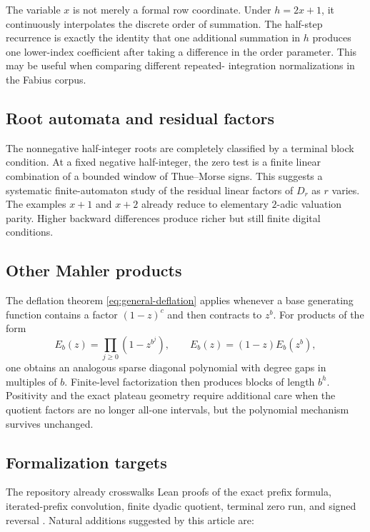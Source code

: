 \documentclass[11pt,oneside]{article}
\numberwithin{equation}{section}
\theoremstyle{definition}
\theoremstyle{remark}
\newcommand{\Diag}{D}
\begin{document}
The variable \(x\) is not merely a formal row coordinate.  Under
\(h=2x+1\), it continuously interpolates the discrete order of summation.  The
half-step recurrence is exactly the identity that one additional summation in
\(h\) produces one lower-index coefficient after taking a difference in the
order parameter.  This may be useful when comparing different repeated-
integration normalizations in the Fabius corpus.

\subsection{Root automata and residual factors}

The nonnegative half-integer roots are completely classified by a terminal
block condition.  At a fixed negative half-integer, the zero test is a finite
linear combination of a bounded window of Thue--Morse signs.  This suggests a
systematic finite-automaton study of the residual linear factors of
\(\Diag_r\) as \(r\) varies.  The examples \(x+1\) and \(x+2\) already reduce
to elementary \(2\)-adic valuation parity.  Higher backward differences
produce richer but still finite digital conditions.

\subsection{Other Mahler products}

The deflation theorem \eqref{eq:general-deflation} applies whenever a base
generating function contains a factor \((1-z)^c\) and then contracts to
\(z^b\).  For products of the form
\[
 E_b(z)=\prod_{j\ge0}(1-z^{b^j}),
 \qquad
 E_b(z)=(1-z)E_b(z^b),
\]
one obtains an analogous sparse diagonal polynomial with degree gaps in
multiples of \(b\).  Finite-level factorization then produces blocks of length
\(b^h\).  Positivity and the exact plateau geometry require additional care
when the quotient factors are no longer all-one intervals, but the polynomial
mechanism survives unchanged.

\subsection{Formalization targets}

The repository already crosswalks Lean proofs of the exact prefix formula,
iterated-prefix convolution, finite dyadic quotient, terminal zero run, and
signed reversal \cite{ReshetnikovAtlas}.  Natural additions suggested by this
article are:
\end{document}
